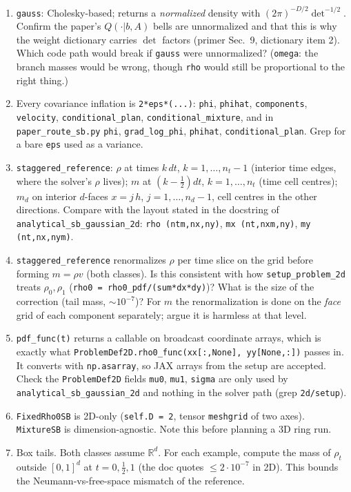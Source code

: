 \documentclass[11pt]{article}
\newcommand{\code}[1]{\texttt{#1}}
\newcommand{\R}{\mathbb{R}}
\newcounter{ex}
\begin{document}
\begin{enumerate}
  \item \code{gauss}: Cholesky-based; returns a \emph{normalized} density with
        $(2\pi)^{-D/2}\det^{-1/2}$. Confirm the paper's $Q(\cdot|b,A)$ bells are unnormalized
        and that this is why the weight dictionary carries $\det$ factors (primer Sec.\ 9,
        dictionary item 2). Which code path would break if \code{gauss} were unnormalized?
        (\code{omega}: the branch masses would be wrong, though \code{rho} would still be
        proportional to the right thing.)
  \item Every covariance inflation is \code{2*eps*(...)}: \code{phi}, \code{phihat},
        \code{components}, \code{velocity}, \code{conditional\_plan}, \code{conditional\_mixture},
        and in \code{paper\_route\_sb.py} \code{phi}, \code{grad\_log\_phi}, \code{phihat},
        \code{conditional\_plan}. Grep for a bare \code{eps} used as a variance.
  \item \code{staggered\_reference}: $\rho$ at times $k\,dt$, $k=1,\dots,n_t-1$ (interior time
        edges, where the solver's $\rho$ lives); $m$ at $(k-\tfrac12)dt$, $k=1,\dots,n_t$
        (time cell centres); $m_d$ on interior $d$-faces $x=j\,h$, $j=1,\dots,n_d-1$, cell
        centres in the other directions. Compare with the layout stated in the docstring of
        \code{analytical\_sb\_gaussian\_2d}: \code{rho (ntm,nx,ny)}, \code{mx (nt,nxm,ny)},
        \code{my (nt,nx,nym)}.
  \item \code{staggered\_reference} renormalizes $\rho$ per time slice on the grid before
        forming $m=\rho v$ (both classes). Is this consistent with how \code{setup\_problem\_2d}
        treats $\rho_0,\rho_1$ (\code{rho0 = rho0\_pdf/(sum*dx*dy)})? What is the size of the
        correction (tail mass, $\sim10^{-7}$)? For $m$ the renormalization is done on the
        \emph{face} grid of each component separately; argue it is harmless at that level.
  \item \code{pdf\_func(t)} returns a callable on broadcast coordinate arrays, which is
        exactly what \code{ProblemDef2D.rho0\_func(xx[:,None], yy[None,:])} passes in. It
        converts with \code{np.asarray}, so JAX arrays from the setup are accepted. Check
        the \code{ProblemDef2D} fields \code{mu0}, \code{mu1}, \code{sigma} are only used by
        \code{analytical\_sb\_gaussian\_2d} and nothing in the solver path (grep
        \code{2d/setup}).
  \item \code{FixedRho0SB} is 2D-only (\code{self.D = 2}, tensor \code{meshgrid} of two axes).
        \code{MixtureSB} is dimension-agnostic. Note this before planning a 3D ring run.
  \item Box tails. Both classes assume $\R^d$. For each example, compute the mass of
        $\rho_t$ outside $[0,1]^d$ at $t=0,\tfrac12,1$ (the doc quotes $\le2\cdot10^{-7}$
        in 2D). This bounds the Neumann-vs-free-space mismatch of the reference.
\end{enumerate}
\end{document}
